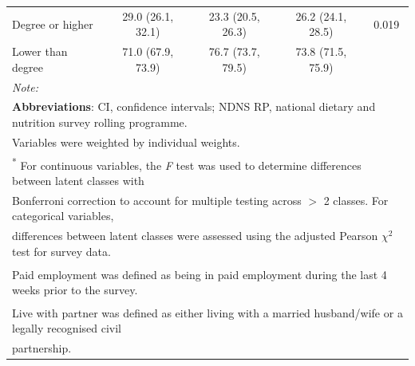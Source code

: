 \begin{table}[H]
\begin{tabular}[t]{lcccc}
	\hspace{1em}Degree or higher & 29.0 (26.1, 32.1) & 23.3 (20.5, 26.3) & 26.2 (24.1, 28.5) & 0.019\\
	\hspace{1em}Lower than degree & 71.0 (67.9, 73.9) & 76.7 (73.7, 79.5) & 73.8 (71.5, 75.9) & \\
	\bottomrule
	\multicolumn{5}{l}{\textit{Note: }}\\
	\multicolumn{5}{l}{\textbf{Abbreviations}: CI, confidence intervals; NDNS RP, national dietary and nutrition survey rolling programme.}\\
	\multicolumn{5}{l}{Variables were weighted by individual weights.}\\
	\multicolumn{5}{l}{\textsuperscript{*} For continuous variables, the \textit{F} test was used to determine differences between latent classes with}\\ 
	\multicolumn{5}{l}{Bonferroni correction to account for multiple testing across $>$ 2 classes. For categorical variables,}\\
	\multicolumn{5}{l}{ differences between latent classes were assessed using the adjusted Pearson $\chi^2$ test for survey data.} \\
	\multicolumn{5}{l}{\textsuperscript{\dag} Paid employment was defined as being in paid employment during the last 4 weeks prior to the survey.}\\
	\multicolumn{5}{l}{\textsuperscript{\ddag} Live with partner was defined as either living with a married husband/wife or a legally recognised civil} \\
	\multicolumn{5}{l}{partnership.}\\
\end{tabular}

\end{table} 





